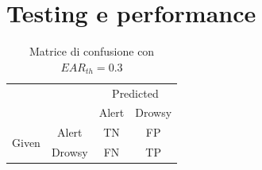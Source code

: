 \documentclass[12pt]{article}
\begin{document}








\newpage



\section{Testing e performance}

\begin{table}[h]
	\centering
	\begin{tabular}{cc|c|c|}
		\cline{3-4}
		&        & \multicolumn{2}{c|}{Predicted} \\ \cline{3-4} 
		&        & Alert         & Drowsy         \\ \hline
		\multicolumn{1}{|c|}{\multirow{2}{*}{Given}} & Alert  & TN & FP\\ \cline{2-4} 
		\multicolumn{1}{|c|}{}                       & Drowsy & FN & TP\\ \hline
	\end{tabular}
	\caption{Matrice di confusione con $EAR_{th}=0.3$}
	\label{table:cm_0_3}
\end{table}
\end{document}
